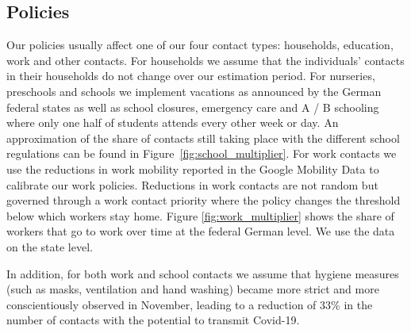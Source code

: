 \subsection{Policies}
\label{subsec:policies}

Our policies usually affect one of our four contact types: households, education, work
and other contacts.
For households we assume that the individuals' contacts in their households do not change
over our estimation period.
For nurseries, preschools and schools we implement vacations as announced by the German
federal states as well as school closures, emergency care and A / B schooling where only
one half of students attends every other week or day.
An approximation of the share of contacts still taking place with the different school
regulations can be found in Figure~\ref{fig:school_multiplier}.
For work contacts we use the reductions in work mobility reported in the Google
Mobility Data \citep{Google2021} to calibrate our work policies. Reductions in work
contacts are not random but governed through a work contact priority where the policy
changes the threshold below which workers stay home. Figure \ref{fig:work_multiplier}
shows the share of workers that go to work over time at the federal German level. We use
the data on the state level.

In addition, for both work and school contacts we assume that hygiene measures (such as
masks, ventilation and hand washing) became more strict and more conscientiously observed
in November, leading to a reduction of 33\% in the number of contacts with the potential
to transmit Covid-19.


